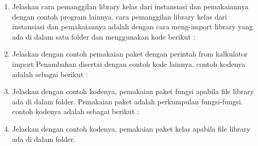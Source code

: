 \begin{enumerate}
    \item Jelaskan cara pemanggilan library kelas dari instansiasi dan pemakaiannya dengan contoh program lainnya.
cara pemanggilan  library kelas dari instansiasi dan pemakaiannya adalah dengan cara meng-import library yang ada di dalam satu folder dan menggunakan kode berikut :
 

    \item Jelaskan dengan contoh pemakaian paket dengan perintah from kalkulator import Penambahan disertai dengan contoh kode lainnya.
contoh kodenya adalah sebagai berikut :
 

    \item Jelaskan dengan contoh kodenya, pemakaian paket fungsi apabila ﬁle library ada di dalam folder.
 Pemakaian paket adalah perkumpulan fungsi-fungsi. contoh kodenya adalah sebagai berikut :
 

    \item Jelaskan dengan contoh kodenya, pemakaian paket kelas apabila ﬁle library ada di dalam folder.
 

\end{enumerate}

